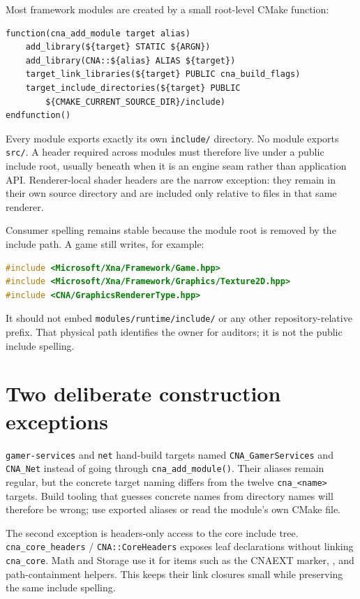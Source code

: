 Most framework modules are created by a small root-level CMake function:

\begin{lstlisting}
function(cna_add_module target alias)
    add_library(${target} STATIC ${ARGN})
    add_library(CNA::${alias} ALIAS ${target})
    target_link_libraries(${target} PUBLIC cna_build_flags)
    target_include_directories(${target} PUBLIC
        ${CMAKE_CURRENT_SOURCE_DIR}/include)
endfunction()
\end{lstlisting}

Every module exports exactly its own \texttt{include/} directory.  No module exports
\texttt{src/}.  A header required across modules must therefore live under a public include root,
usually beneath  when it is an engine seam rather than application API.
Renderer-local shader headers are the narrow exception: they remain in their own source directory
and are included only relative to files in that same renderer.

Consumer spelling remains stable because the module root is removed by the include path.  A game
still writes, for example:

\begin{lstlisting}[language=C++]
#include <Microsoft/Xna/Framework/Game.hpp>
#include <Microsoft/Xna/Framework/Graphics/Texture2D.hpp>
#include <CNA/GraphicsRendererType.hpp>
\end{lstlisting}

It should not embed \texttt{modules/runtime/include/} or any other repository-relative prefix.
That physical path identifies the owner for auditors; it is not the public include spelling.

\section{Two deliberate construction exceptions}

\texttt{gamer-services} and \texttt{net} hand-build targets named
\texttt{CNA\_GamerServices} and \texttt{CNA\_Net} instead of going through
\texttt{cna\_add\_module()}.  Their aliases remain regular, but the concrete target naming differs
from the twelve \texttt{cna\_<name>} targets.  Build tooling that guesses concrete names from
directory names will therefore be wrong; use exported aliases or read the module's own CMake file.

The second exception is headers-only access to the core include tree.  \texttt{cna\_core\_headers}
 / \texttt{CNA::CoreHeaders} exposes leaf declarations without linking \texttt{cna\_core}.  Math
and Storage use it for items such as the CNAEXT marker, , and path-containment
helpers.  This keeps their link closures small while preserving the same include spelling.

